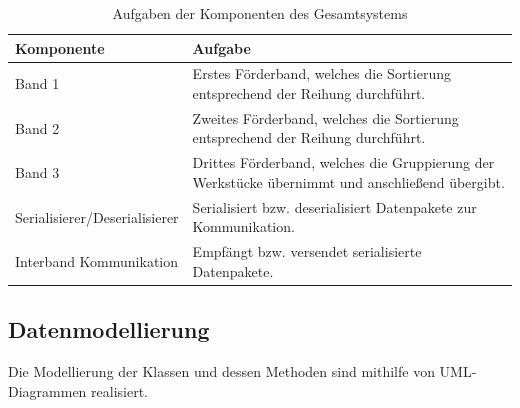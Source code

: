 \documentclass[a4paper, 11pt]{article}
\begin{document}
\begin{table}[h]
\center
\begin{tabularx}{\textwidth}{|l|X|}
\hline
\textbf{Komponente}&\textbf{Aufgabe}\\
\hline
Band 1&Erstes Förderband, welches die Sortierung entsprechend der Reihung durchführt.\\
\hline
Band 2&Zweites Förderband, welches die Sortierung entsprechend der Reihung durchführt.\\
\hline
Band 3&Drittes Förderband, welches die Gruppierung der Werkstücke übernimmt und anschließend übergibt.\\
\hline
Serialisierer/Deserialisierer&Serialisiert bzw. deserialisiert Datenpakete zur Kommunikation.\\
\hline
Interband Kommunikation&Empfängt bzw. versendet serialisierte Datenpakete.\\
\hline
\end{tabularx}
\caption{Aufgaben der Komponenten des Gesamtsystems}
\label{archtotalcomp}
\end{table}

\newpage

\subsection{Datenmodellierung} 
Die Modellierung der Klassen und dessen Methoden sind mithilfe von UML-Diagrammen realisiert.
\end{document}
